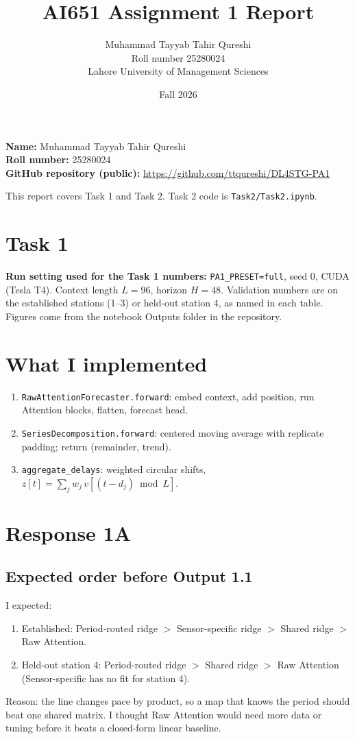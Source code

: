 \documentclass[11pt,a4paper]{article}
\title{AI651 Assignment 1 Report}
\author{Muhammad Tayyab Tahir Qureshi\\Roll number 25280024\\Lahore University of Management Sciences}
\date{Fall 2026}
\begin{document}
\maketitle

\noindent\textbf{Name:} Muhammad Tayyab Tahir Qureshi\\
\noindent\textbf{Roll number:} 25280024\\
\noindent\textbf{GitHub repository (public):}
\url{https://github.com/ttqureshi/DL4STG-PA1}

\vspace{0.5em}
\noindent This report covers Task 1 and Task 2. Task 2 code is \texttt{Task2/Task2.ipynb}.

\section*{Task 1}

\noindent\textbf{Run setting used for the Task 1 numbers:}
\texttt{PA1\_PRESET=full}, seed 0, CUDA (Tesla T4). Context length $L=96$, horizon $H=48$.
Validation numbers are on the established stations (1--3) or held-out station 4, as named in each table.
Figures come from the notebook Outputs folder in the repository.

\section*{What I implemented}
\begin{enumerate}
  \item \texttt{RawAttentionForecaster.forward}: embed context, add position, run Attention blocks, flatten, forecast head.
  \item \texttt{SeriesDecomposition.forward}: centered moving average with replicate padding; return (remainder, trend).
  \item \texttt{aggregate\_delays}: weighted circular shifts, $z[t]=\sum_j w_j\,v[(t-d_j)\bmod L]$.
\end{enumerate}

\section{Response 1A}
\subsection*{Expected order before Output 1.1}
I expected:
\begin{enumerate}
  \item Established: Period-routed ridge $>$ Sensor-specific ridge $>$ Shared ridge $>$ Raw Attention.
  \item Held-out station 4: Period-routed ridge $>$ Shared ridge $>$ Raw Attention (Sensor-specific has no fit for station 4).
\end{enumerate}
Reason: the line changes pace by product, so a map that knows the period should beat one shared matrix. I thought Raw Attention would need more data or tuning before it beats a closed-form linear baseline.
\end{document}
